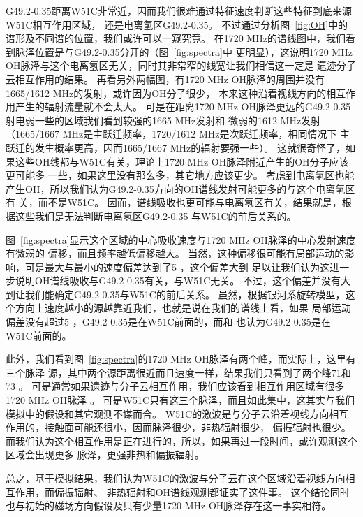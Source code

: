 G49.2-0.35距离W51C非常近，因而我们很难通过特征速度判断这些特征到底来源W51C相互作用区域，
还是电离氢区G49.2-0.35。
不过通过分析图~\ref{fig:OH}中的谱形及不同谱的位置，我们或许可以一窥究竟。
在1720 MHz的谱线图中，我们看到脉泽位置是与G49.2-0.35分开的（图~\ref{fig:spectra}中
更明显），这说明1720 MHz OH脉泽与这个电离氢区无关，同时其非常窄的线宽让我们相信这一定是
遗迹分子云相互作用的结果。
再看另外两幅图，有1720 MHz OH脉泽的周围并没有1665/1612 MHz的发射，或许因为OH分子很少，
本来这种沿着视线方向的相互作用产生的辐射流量就不会太大。
可是在距离1720 MHz OH脉泽更远的G49.2-0.35射电弱一些的区域我们看到较强的1665 MHz发射和
微弱的1612 MHz发射（1665/1667 MHz是主跃迁频率，1720/1612 MHz是次跃迁频率，相同情况下
主跃迁的发生概率更高，因而1665/1667 MHz的辐射要强一些）。
这就很奇怪了，如果这些OH线都与W51C有关，理论上1720 MHz OH脉泽附近产生的OH分子应该更可能多
一些，如果这里没有那么多，其它地方应该更少。
考虑到电离氢区也能产生OH，所以我们认为G49.2-0.35方向的OH谱线发射可能更多的与这个电离氢区有
关，而不是W51C。
因而，谱线吸收也更可能与电离氢区有关，结果就是，根据这些我们是无法判断电离氢区G49.2-0.35
与W51C的前后关系的。

图~\ref{fig:spectra}显示这个区域的中心吸收速度与1720 MHz OH脉泽的中心发射速度有微弱的
偏移，而且频率越低偏移越大。
当然，这种偏移很可能有局部运动的影响，可是最大与最小的速度偏差达到了5 \kms，这个偏差大到
足以让我们认为这进一步说明OH谱线吸收与G49.2-0.35有关，与W51C无关。
不过，这个偏差并没有大到让我们能确定G49.2-0.35与W51C的前后关系。
虽然，根据银河系旋转模型，这个方向上速度越小的源越靠近我们，也就是说在我们的谱线上看，如果
局部运动偏差没有超过5 \kms，G49.2-0.35是在W51C前面的，而\citet{Brogan2013}和
\citet{Ginsburg2015}也认为G49.2-0.35是在W51C前面的。

此外，我们看到图~\ref{fig:spectra}的1720 MHz OH脉泽有两个峰，而实际上，这里有三个脉泽
源，其中两个源距离很近而且速度一样\citep{Brogan2013}，结果我们只看到了两个峰71和73 \kms。
可是通常如果遗迹与分子云相互作用，我们应该看到相互作用区域有很多1720 MHz OH脉泽
\citep{Wardle2012}。
可是W51C只有这三个脉泽，而且如此集中，这其实与我们模拟中的假设和其它观测不谋而合。
W51C的激波是与分子云沿着视线方向相互作用的，接触面可能还很小，因而脉泽很少，非热辐射很少，
偏振辐射也很少。
而我们认为这个相互作用是正在进行的，所以，如果再过一段时间，或许观测这个区域会出现更多
脉泽，更强非热和偏振辐射。

总之，基于模拟结果，我们认为W51C的激波与分子云在这个区域沿着视线方向相互作用，而偏振辐射、
非热辐射和OH谱线观测都证实了这件事。
这个结论同时也与初始的磁场方向假设及只有少量1720 MHz OH脉泽存在这一事实相符。

